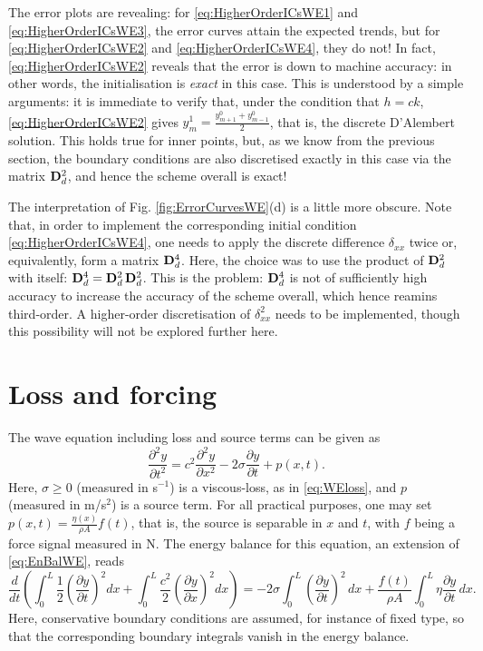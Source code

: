 \documentclass[11pt,twoside,a4paper,english]{book}
\newcommand{\dss}{\delta_{xx}}
\begin{document}
The error plots are revealing: for \eqref{eq:HigherOrderICsWE1} and \eqref{eq:HigherOrderICsWE3}, the error curves attain the expected trends, but for \eqref{eq:HigherOrderICsWE2} and \eqref{eq:HigherOrderICsWE4}, they do not! In fact, \eqref{eq:HigherOrderICsWE2} reveals that the error is down to machine accuracy: in other words, the initialisation is \emph{exact} in this case. This is understood by a simple arguments: it is immediate to verify that, under the condition that $h=ck$, \eqref{eq:HigherOrderICsWE2} gives $y^1_m = \frac{y^0_{m+1}+y^0_{m-1}}{2}$, that is, the discrete D'Alembert solution. This holds true for inner points, but, as we know from the previous section, the boundary conditions are also discretised exactly in this case via the matrix ${\bf D}^2_d$, and hence the scheme overall is exact! 

The interpretation of Fig. \ref{fig:ErrorCurvesWE}(d) is a little more obscure. Note that, in order to implement the corresponding initial condition \eqref{eq:HigherOrderICsWE4}, one needs to apply the discrete difference $\dss$ twice or, equivalently, form a matrix ${\bf D}^4_d$. Here, the choice was to use the product of ${\bf D}^2_d$ with itself: ${\bf D}^4_d = {\bf D}^2_d \, {\bf D}^2_d$. This is the problem: ${\bf D}^4_d$ is not of sufficiently high accuracy to increase the accuracy of the scheme overall, which hence reamins third-order. A higher-order discretisation of $\dss^2$ needs to be implemented, though this possibility will not be explored further here. 


\section{Loss and forcing}


The wave equation including loss and source terms can be given as
\begin{equation}
\frac{\partial^2 y}{\partial t^2} = c^2 \frac{\partial^2 y}{\partial x^2}-2 \sigma \frac{\partial y}{\partial t} + p(x,t).
\end{equation}
Here, $\sigma \geq 0$ (measured in s$^{-1}$) is a viscous-loss, as in \eqref{eq:WEloss}, and $p$ (measured in m/s$^2$) is a source term. For all practical purposes, one may set $p(x,t) = \frac{\eta(x)}{\rho A} f(t)$, that is, the source is separable in $x$ and $t$, with $f$ being a force signal measured in N. The energy balance for this equation, an extension of \eqref{eq:EnBalWE}, reads
\begin{equation}\label{eq:EnBalanceWEQNloss}
\frac{d}{dt}\left( \int_{0}^{L} \frac{1}{2}\left( \frac{\partial y}{\partial t} \right)^2 dx + \int_{0}^{L} \frac{c^2}{2}\left( \frac{\partial y}{\partial x} \right)^2 dx \right) = -2\sigma \int_0^L \left(\frac{\partial y}{\partial t}\right)^2 \, dx + \frac{f(t)}{\rho A}\int_0^L \eta \frac{\partial y}{\partial t}\, dx.
\end{equation}
Here, conservative boundary conditions are assumed, for instance of fixed type, so that the corresponding boundary integrals vanish in the energy balance.
\end{document}
